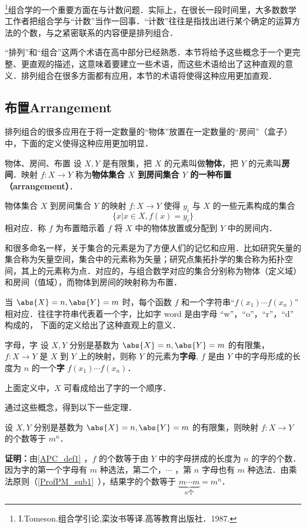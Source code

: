 
\footnote{I.Tomeson.组合学引论,栾汝书等译.高等教育出版社．1987.}组合学的一个重要方面在与计数问题．实际上，在很长一段时间里，大多数数学工作者把组合学与“计数”当作一回事．“计数”往往是指找出进行某个确定的运算方法的个数，与之紧密联系的内容便是排列组合．

“排列”和“组合”这两个术语在高中部分已经熟悉．本节将给予这些概念于一个更完整、更直观的描述，这意味着要建立一些术语，而这些术语给出了这种直观的意义．排列组合在很多方面都有应用，本节的术语将使得这种应用更加直观．
\subsection{布置Arrangement}
排列组合的很多应用在于将一定数量的“物体”放置在一定数量的“房间”（盒子）中，下面的定义使得这种应用更加明显．
\begin{definition}{物体、房间、布置}\label{APC_def2}
设 $X,Y$ 是有限集，把 $X$ 的元素叫做\textbf{物体}，把 $Y$ 的元素叫\textbf{房间}．映射 $f:X\rightarrow Y$ 称为\textbf{物体集合 $X$ 到房间集合 $Y$ 的一种\textbf{布置}（arrangement）}．
\end{definition}
物体集合 $X$ 到房间集合 $Y$ 的映射 $f:X\rightarrow Y$ 使得 $y_i$ 与 $X$ 的一些元素构成的集合
\begin{equation}
\{x|x\in X,f(x)=y_i\}
\end{equation}
相对应．称 $f$ 为布置暗示着 $f$ 将 $X$ 中的物体放置或分配到 $Y$ 中的房间内．

和很多命名一样，关于集合的元素是为了方便人们的记忆和应用．比如研究矢量的集合称为矢量空间，集合中的元素称为矢量；研究点集拓扑学的集合称为拓扑空间，其上的元素称为点．对应的，与组合数学对应的集合分别称为物体（定义域）和房间（值域），而物体到房间的映射称为布置．

当 $\abs{X}=n,\abs{Y}=m$ 时，每个函数 $f$ 和一个字符串“$f(x_1)\cdots f(x_n)$” 相对应．往往字符串代表着一个字，比如字 word 是由字母 “w”，“o”，“r”，“d” 构成的， 下面的定义给出了这种直观上的意义．
\begin{definition}{字母，字}\label{APC_def1}
设 $X,Y$ 分别是基数为 $\abs{X}=n,\abs{Y}=m$ 的有限集， $f:X\rightarrow Y$ 是 $X$ 到 $Y$ 上的映射，则称 $Y$ 的元素为\textbf{字母}, $f$ 是由 $Y$ 中的字母形成的长度为 $n$ 的一个\textbf{字} $f(x_1)\cdots f(x_n)$．
\end{definition}
上面定义中，$X$ 可看成给出了字的一个顺序．

通过这些概念，得到以下一些定理．

\begin{theorem}{}\label{APC_the1}
设 $X,Y$ 分别是基数为 $\abs{X}=n,\abs{Y}=m$ 的有限集，则映射 $f:X\rightarrow Y$ 的个数等于 $m^n$．
\end{theorem}
\textbf{证明：}由\autoref{APC_def1} ，$f$ 的个数等于由 $Y$ 中的字母拼成的长度为 $n$ 的字的个数．因为字的第一个字母有 $m$ 种选法，第二个，$\cdots$ ，第 $n$ 字母也有 $m$ 种选法．由乘法原则（\autoref{ProfPM_sub1}~），结果字的个数等于 $\underbrace{m\cdots m}_{n\text{个}}=m^n$．

